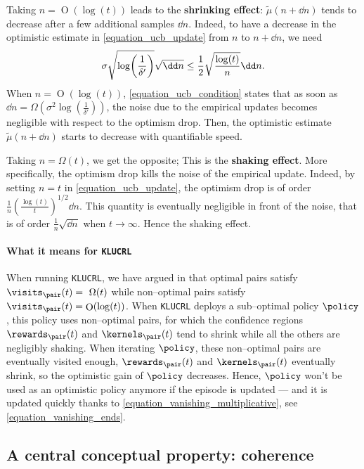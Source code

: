 \documentclass[preprint,cleveref,12pt]{colt2025}
\DeclarePairedDelimiter{\parens}{(}{)}	%
\DeclareMathOperator*{\OH}{\mathrm{O}}
\newcommand{\strong}[1]{\textbf{#1}}
\begin{document}
    
    Taking $n = \OH(\log(t))$ leads to the \strong{shrinking effect}: $\widetilde{\mu}(n + \dd n)$ tends to decrease after a few additional samples $\dd n$.
    Indeed, to have a decrease in the optimistic estimate in \eqref{equation_ucb_update} from $n$ to $n + \dd n$, we need
    \begin{equation}
    \label{equation_ucb_condition}
        \sigma \sqrt{\log\parens*{\frac 1{\delta'}}}
        \sqrt{\dd n}
        \le 
        \frac 12 \sqrt{\frac{\log(t)}n} \dd n
        .
    \end{equation}
    When $n = \OH(\log(t))$, \eqref{equation_ucb_condition} states that as soon as $\dd n = \Omega(\sigma^2 \log(\frac 1{\delta'}))$, the noise due to the empirical updates becomes negligible with respect to the optimism drop.
    Then, the optimistic estimate $\widetilde{\mu}(n + \dd n)$ starts to decrease with quantifiable speed. 
    
    Taking $n = \Omega(t)$, we get the opposite; This is the \strong{shaking effect}.
    More specifically, the optimism drop kills the noise of the empirical update.
    Indeed, by setting $n = t$ in \eqref{equation_ucb_update}, the optimism drop is of order $\frac 1n (\frac{\log(t)}t)^{1/2} \dd n$.
    This quantity is eventually negligible in front of the noise, that is of order $\frac 1n \sqrt{\dd n}$ when $t \to \infty$.
    Hence the shaking effect.

    \paragraph{What it means for \texttt{KLUCRL}}
    When running \texttt{KLUCRL}, we have argued in  that optimal pairs satisfy $\visits_\pair (t) = \Omega(t)$ while non--optimal pairs satisfy $\visits_\pair (t) = \OH(\log(t))$. 
    When \texttt{KLUCRL} deploys a sub--optimal policy $\policy$, this policy uses non--optimal pairs, for which the confidence regions $\rewards_\pair(t)$ and $\kernels_\pair(t)$ tend to shrink while all the others are negligibly shaking. 
    When iterating $\policy$, these non--optimal pairs are eventually visited enough, $\rewards_\pair(t)$ and $\kernels_\pair(t)$ eventually shrink, so the optimistic gain of $\policy$ decreases.
    Hence, $\policy$ won't be used as an optimistic policy anymore if the episode is updated --- and it is updated quickly thanks to \eqref{equation_vanishing_multiplicative}, see \eqref{equation_vanishing_ends}.

    \subsection{A central conceptual property: coherence}
    \label{ssec:coherence}
    \label{section_coherence}
\end{document}
